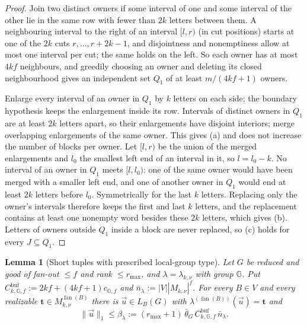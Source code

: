 \documentclass[11pt]{article}
\numberwithin{equation}{section}
\theoremstyle{plain}
\newtheorem{lemma}[theorem]{Lemma}
\theoremstyle{definition}
\theoremstyle{remark}
\newcommand{\tuple}[1]{\vec{#1}}
\newcommand{\fan}{\operatorname{fan}}
\theoremstyle{plain}
\begin{document}
\begin{proof}
Join two distinct owners if some interval of one and some interval of the
other lie in the same row with fewer than $2k$ letters between them.  A
neighbouring interval to the right of an interval $[l,r)$ (in cut positions)
starts at one of the $2k$ cuts $r,\ldots,r+2k-1$, and disjointness and
nonemptiness allow at most one interval per cut; the same holds on the left.
So each owner has at most $4kf$ neighbours, and greedily choosing an owner and
deleting its closed neighbourhood gives an independent set $Q_1$ of at least
$m/(4kf+1)$ owners.

Enlarge every interval of an owner in $Q_1$ by $k$ letters on each side; the
boundary hypothesis keeps the enlargement inside its row.  Intervals of
distinct owners in $Q_1$ are at least $2k$ letters apart, so their enlargements
have disjoint interiors; merge overlapping enlargements of the same owner.
This gives (a) and does not increase the number of blocks per owner.  Let
$[l,r)$ be the union of the merged enlargements and $l_0$ the smallest left end
of an interval in it, so $l=l_0-k$.  No interval of an owner in $Q_1$ meets
$[l,l_0)$: one of the same owner would have been merged with a smaller left
end, and one of another owner in $Q_1$ would end at least $2k$ letters before
$l_0$.  Symmetrically for the last $k$ letters.  Replacing only the owner's
intervals therefore keeps the first and last $k$ letters, and the replacement
contains at least one nonempty word besides these $2k$ letters, which gives
(b).  Letters of owners outside $Q_1$ inside a block are never replaced, so
(c) holds for every $J\subseteq Q_1$.
\end{proof}

\begin{lemma}[Short tuples with prescribed local-group type]
\label{lem:local-group-shortest}
Let $G$ be reduced and good of fan-out $\le f$ and rank $\le r_{\max}$, and
$\lambda=\lambda_{k,\nu}$ with group ${\mathbb G}$.  Put
$C^{\mathrm{buf}}_{k,{\mathbb G},f}:=2kf+(4kf+1)c_{{\mathbb G},f}$ and
$\bar n_\lambda:=|V||M_{k,\nu}|^f$.  For every $B\in V$ and every realizable
$\mathbf t\in M_{k,\nu}^{\fan(B)}$ there is $\tuple u\in L_B(G)$ with
$\lambda^{(\fan(B))}(\tuple u)=\mathbf t$ and
\[
 \|\tuple u\|_1\le\beta_\lambda:=(r_{\max}+1)\,\bar\theta_G\,
 C^{\mathrm{buf}}_{k,{\mathbb G},f}\,\bar n_\lambda .
\]
\end{lemma}
\end{document}
